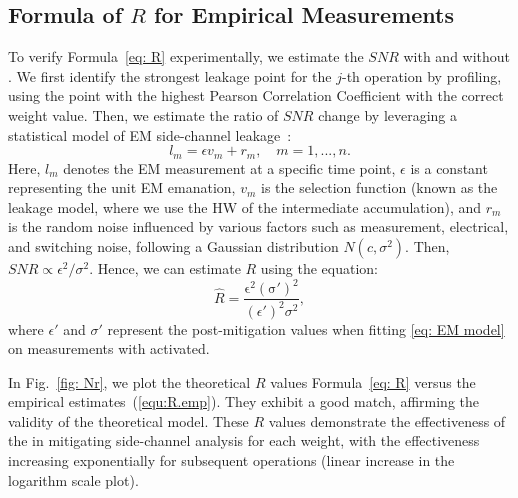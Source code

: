 \subsection{Formula of $R$ for Empirical Measurements}
To verify Formula~\eqref{eq: R} experimentally, we estimate the $SNR$ with and without \method. 
 We first identify the strongest leakage point for the $j$-th operation by profiling, using the point with the highest Pearson Correlation Coefficient with the correct weight value.
Then, we estimate the ratio of $SNR$ change by leveraging a statistical model of EM side-channel leakage~\cite{fei2015statistics}:
\begin{equation}
    \label{eq: EM model}
    l_m = \epsilon v_m + r_m, \quad m=1,...,n.
\end{equation}
Here, $l_m$ denotes the EM measurement at a specific time point, $\epsilon$ is a constant representing the unit EM emanation, $v_m$ is the selection function (known as the leakage model, where we use the HW of the intermediate accumulation), and $r_m$ is the random noise influenced by various factors such as measurement, electrical, and switching noise, following a Gaussian distribution $N(c,\sigma^2)$. Then, $SNR \propto \epsilon^2/\sigma^2$. Hence, we can estimate $R$ using the equation:
\begin{equation}
    \hat R  = \frac{\mathrm{\epsilon^2 (\sigma')^2}}{(\epsilon')^2 \sigma^2},\label{equ:R.emp}
\end{equation}
where $\epsilon'$ and $\sigma'$ represent the post-mitigation values when fitting \eqref{eq: EM model} on measurements with \method activated. 

In Fig.~\ref{fig: Nr}, we plot the theoretical $R$ values Formula~\eqref{eq: R} versus the empirical estimates~(\ref{equ:R.emp}). They exhibit a good match, affirming the validity of the theoretical model.
These $R$ values demonstrate the effectiveness of the \method in mitigating side-channel analysis for each weight, with the effectiveness increasing exponentially for subsequent operations (linear increase in the logarithm scale plot).
